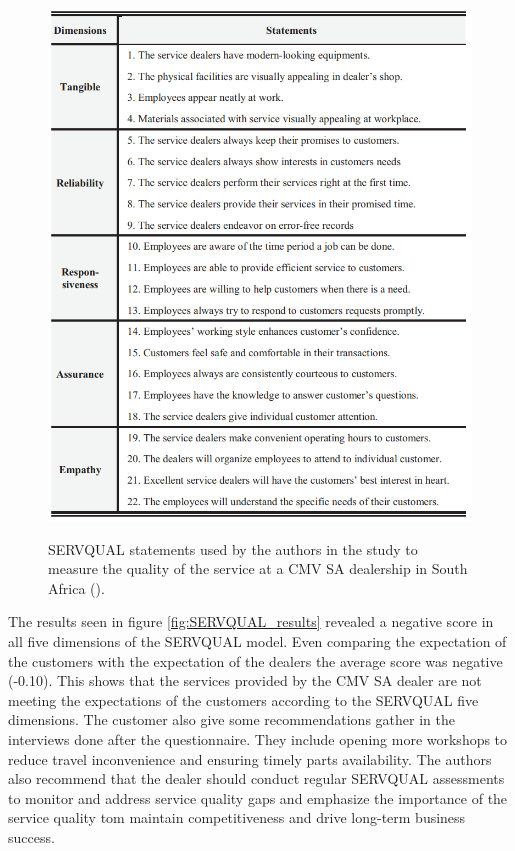\begin{figure}[h]
  \caption{SERVQUAL statements used by the authors in the study to measure the quality of the service at a CMV SA dealership in South Africa (\cite{Measuring_After_sales_Service_Quality}).}
  \centering
  \includegraphics[width=\textwidth]{figs/SERVQUAL_statements}
  \label{fig:SERVQUAL_statements}
\end{figure}


The results seen in figure \ref{fig:SERVQUAL_results} revealed a negative score in all five dimensions of the SERVQUAL model. 
Even comparing the expectation of the customers with the expectation of the dealers the average score was negative (-0.10).
This shows that the services provided by the CMV SA dealer are not meeting the expectations of the customers according to the SERVQUAL five dimensions.
The customer also give some recommendations gather in the interviews done after the questionnaire. 
They include opening more workshops to reduce travel inconvenience and ensuring timely parts availability.
The authors also recommend that the dealer should conduct regular SERVQUAL assessments to monitor and address service quality gaps and emphasize the importance of the service quality tom maintain competitiveness and drive long-term business success. \cite{Measuring_After_sales_Service_Quality}


